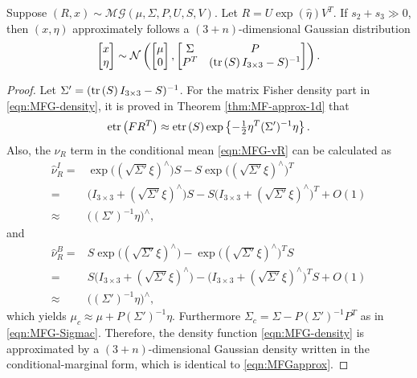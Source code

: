 \begin{theorem}
	Suppose $(R,x) \sim \mathcal{MG}(\mu,\allowbreak \Sigma,\allowbreak P,\allowbreak U,\allowbreak S,\allowbreak V)$.
	Let $R=U\exp(\hat{\eta})V^T$.
	If $s_2+s_3 \gg 0$, then $(x,\eta)$ approximately follows a $(3+n)$-dimensional Gaussian distribution
	\begin{align}
		\begin{bmatrix} x \\ \eta \end{bmatrix}
		\sim
		\mathcal{N} \left(
		\begin{bmatrix} \mu \\ 0 \end{bmatrix},
		\begin{bmatrix} \Sigma & P \\ P^T & (\mathrm{tr}\left( S \right)I_{3 \times 3}-S)^{-1} \end{bmatrix}
		\right).\label{eqn:MFGapprox}
	\end{align}
\end{theorem}
\begin{proof}
	Let $\Sigma' = (\mathrm{tr}\left( S \right)I_{3\times 3}-S)^{-1}$.
	For the matrix Fisher density part in \eqref{eqn:MFG-density}, it is proved in Theorem \ref{thm:MF-approx-1d} that
	\begin{align*}
		\mathrm{etr}\left( FR^T \right) \approx \mathrm{etr}\left( S \right) \exp\left\{ -\tfrac{1}{2}\eta^T (\Sigma')^{-1} \eta \right\}.
	\end{align*}
	Also, the $\nu_R$ term in the conditional mean \eqref{eqn:MFG-vR} can be calculated as
	\begin{align*}
		\hat\nu_R^I = &\exp\big((\sqrt{\Sigma'}\xi)^\wedge\big)S - S\exp\big((\sqrt{\Sigma'}\xi)^\wedge\big)^T  \\
		= &\big( I_{3\times 3} + (\sqrt{\Sigma'}\xi)^\wedge \big)S - S\big( I_{3\times 3} + (\sqrt{\Sigma'}\xi)^\wedge \big)^T + O(1) \\
		\approx &\big((\Sigma')^{-1}\eta\big)^\wedge,
	\end{align*}
	and
	\begin{align*}
		\hat\nu_R^B = &S\exp\big((\sqrt{\Sigma'}\xi)^\wedge\big) - \exp\big((\sqrt{\Sigma'}\xi)^\wedge\big)^TS  \\
		= &S\big( I_{3\times 3} + (\sqrt{\Sigma'}\xi)^\wedge \big) - \big( I_{3\times 3} + (\sqrt{\Sigma'}\xi)^\wedge \big)^TS + O(1) \\
		\approx &\big((\Sigma')^{-1}\eta\big)^\wedge,
	\end{align*}
	which yields $\mu_c \approx \mu+P(\Sigma')^{-1}\eta$.
	Furthermore  $\Sigma_c = \Sigma - P(\Sigma')^{-1}P^T$ as in \eqref{eqn:MFG-Sigmac}. 
	Therefore, the density function \eqref{eqn:MFG-density} is approximated by a $(3+n)$-dimensional Gaussian density written in the conditional-marginal form, which is identical to \eqref{eqn:MFGapprox}.
\end{proof}

